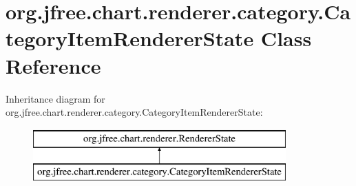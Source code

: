 \hypertarget{classorg_1_1jfree_1_1chart_1_1renderer_1_1category_1_1_category_item_renderer_state}{}\section{org.\+jfree.\+chart.\+renderer.\+category.\+Category\+Item\+Renderer\+State Class Reference}
\label{classorg_1_1jfree_1_1chart_1_1renderer_1_1category_1_1_category_item_renderer_state}
Inheritance diagram for org.\+jfree.\+chart.\+renderer.\+category.\+Category\+Item\+Renderer\+State\+:\begin{figure}[H]
\begin{center}
\leavevmode
\includegraphics[height=2.000000cm]{classorg_1_1jfree_1_1chart_1_1renderer_1_1category_1_1_category_item_renderer_state}
\end{center}
\end{figure}

